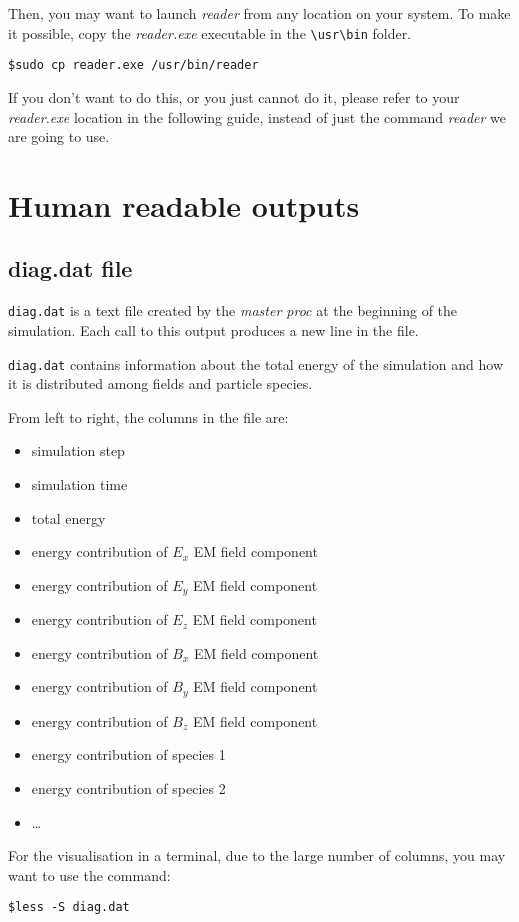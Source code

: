 \documentclass[11pt,a4paper]{report}
\begin{document}
Then, you may want to launch \emph{reader} from any location on your system. To make it possible, copy the \emph{reader.exe} executable in the \verb+\usr\bin+ folder.
\begin{verbatim}
$sudo cp reader.exe /usr/bin/reader
\end{verbatim}
If you don't want to do this, or you just cannot do it, please refer to your \emph{reader.exe} location in the following guide, instead of just the command \emph{reader} we are going to use.

\section{Human readable outputs}
\subsection{diag.dat file}
\verb+diag.dat+ is a text file created by the \emph{master proc} at the beginning of the simulation. Each call to this output produces a new line in the file.

\verb+diag.dat+ contains information about the total energy of the simulation and how it is distributed among fields and particle species.

From left to right, the columns in the file are:
\begin{itemize}
\item simulation step
\item simulation time
\item total energy
\item energy contribution of $E_x$ EM field component
\item energy contribution of $E_y$ EM field component
\item energy contribution of $E_z$ EM field component
\item energy contribution of $B_x$ EM field component
\item energy contribution of $B_y$ EM field component
\item energy contribution of $B_z$ EM field component
\item energy contribution of species 1
\item energy contribution of species 2
\item \ldots
\end{itemize}
For the visualisation in a terminal, due to the large number of columns, you may want to use the command:
\begin{verbatim}
$less -S diag.dat
\end{verbatim}
\end{document}
